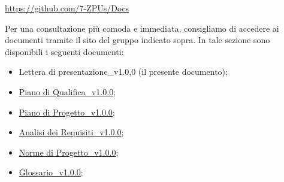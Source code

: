 \documentclass[a4paper,12pt]{article}
\begin{document}
\begin{center}
\url{https://github.com/7-ZPUs/Docs}
\end{center}
Per una consultazione più comoda e immediata, consigliamo di accedere ai documenti tramite il sito del gruppo indicato sopra.
\newpage
\noindent In tale sezione sono disponibili i seguenti documenti:
\vspace{0.3cm}

\begin{itemize}
    \item Lettera di presentazione\_v1.0,0 (il presente documento);
    \item \href{https://7-zpus.github.io/Docs/assets/pdf/PianoDiQualifica.pdf}{Piano di Qualifica\_v1.0.0};
    \item \href{https://7-zpus.github.io/Docs/assets/pdf/PianoDiProgetto.pdf}{Piano di Progetto\_v1.0.0};
    \item \href{https://7-zpus.github.io/Docs/assets/pdf/AnalisiDeiRequisiti.pdf}{Analisi dei Requisiti\_v1.0.0};
    \item \href{https://7-zpus.github.io/Docs/assets/pdf/NormeDiProgetto.pdf}{Norme di Progetto\_v1.0.0};
    \item \href{https://7-zpus.github.io/Docs/assets/pdf/Glossario.pdf}{Glossario\_v1.0.0};
\end{itemize}
\end{document}
